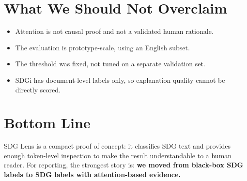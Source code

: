 \documentclass[10pt]{article}
\begin{document}
\section*{What We Should Not Overclaim}
\begin{itemize}
    \item Attention is not causal proof and not a validated human rationale.
    \item The evaluation is prototype-scale, using an English subset.
    \item The threshold was fixed, not tuned on a separate validation set.
    \item SDGi has document-level labels only, so explanation quality cannot be directly scored.
\end{itemize}

\section*{Bottom Line}
SDG Lens is a compact proof of concept: it classifies SDG text and provides
enough token-level inspection to make the result understandable to a human
reader. For reporting, the strongest story is: \textbf{we moved from black-box
SDG labels to SDG labels with attention-based evidence.}
\end{document}

